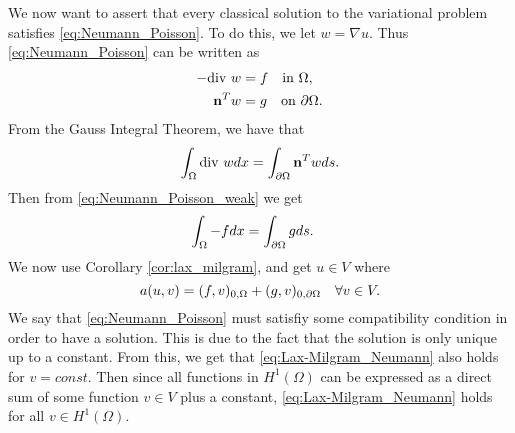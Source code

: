 We now want to assert that every classical solution to the variational problem satisfies \eqref{eq:Neumann_Poisson}.
To do this, we let $w=\nabla u$. Thus \eqref{eq:Neumann_Poisson} can be written as
\begin{align}\label{eq:Neumann_Poisson_weak}
\begin{split}
    -\text{div } w &= f \quad \text{in } \Omega, \\
    \mathbf{n}^Tw &= g \quad \text{on } \partial \Omega.
\end{split}    
\end{align}
From the Gauss Integral Theorem, we have that
\[\int_{\Omega} \text{div } w dx = \int_{\partial \Omega} \mathbf{n}^Tw ds.\]
Then from \eqref{eq:Neumann_Poisson_weak} we get
\begin{align}
\begin{split}
\int_{\Omega} -f dx &= \int_{\partial \Omega} g ds.
\end{split}
\end{align}
We now use Corollary \ref{cor:lax_milgram}, and get $u\in V$ where
\begin{equation}\label{eq:Lax-Milgram_Neumann}
  a(u,v) = (f,v)_{0,\Omega} + (g,v)_{0,\partial \Omega} \quad \forall v\in V.  
\end{equation}
We say that \eqref{eq:Neumann_Poisson} must satisfiy some compatibility condition in order to have a solution.
 This is due to the fact that the solution is only unique up to a constant.
  From this, we get that \ref{eq:Lax-Milgram_Neumann} also holds for $v=const$.
Then since all functions in $H^1(\Omega)$ can be expressed as a direct sum of some function $v\in V$ plus a constant, \eqref{eq:Lax-Milgram_Neumann} holds for all $v\in H^1(\Omega)$.